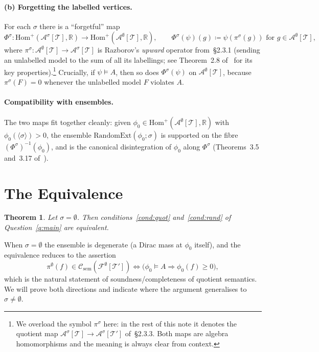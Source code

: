 \documentclass[11pt]{article}
\newtheorem{theorem}{Theorem}
\theoremstyle{definition}
\newcommand{\R}{\mathbb{R}}
\newcommand{\A}{\mathcal{A}}
\newcommand{\F}{\mathcal{F}}
\newcommand{\T}{\mathcal{T}}
\newcommand{\Csem}{\mathcal{C}_{\mathrm{sem}}}
\newcommand{\Homp}{\mathrm{Hom}^{+}}
\newcommand{\RandomExt}{\mathrm{RandomExt}}
\begin{document}
\paragraph{(b) Forgetting the labelled vertices.}
For each $\sigma$ there is a ``forgetful'' map
\[
  \Phi^{\sigma} \colon
  \Homp(\A^{\sigma}[\T], \R) \to \Homp(\A^{\emptyset}[\T], \R),
  \qquad
  \Phi^{\sigma}(\psi)(g) \coloneqq \psi(\pi^{\sigma}(g))
  \text{ for } g \in \A^{\emptyset}[\T],
\]
where $\pi^{\sigma} \colon \A^{\emptyset}[\T] \to \A^{\sigma}[\T]$ is
Razborov's \emph{upward} operator from~\S2.3.1 (sending an unlabelled model
to the sum of all its labellings; see Theorem~2.8 of~\cite{Razborov2007} for
its key properties).\footnote{We overload the symbol $\pi^{\sigma}$ here: in
the rest of this note it denotes the quotient map
$\A^{\sigma}[\T] \to \A^{\sigma}[\T']$ of~\S2.3.3. Both maps are
algebra homomorphisms and the meaning is always clear from context.}
Crucially, if $\psi \models A$, then so does $\Phi^{\sigma}(\psi)$ on
$\A^{\emptyset}[\T]$, because $\pi^{\sigma}(F) = 0$ whenever the unlabelled
model $F$ violates $A$.

\paragraph{Compatibility with ensembles.}
The two maps fit together cleanly: given
$\phi_0 \in \Homp(\A^{\emptyset}[\T], \R)$ with $\phi_0(\langle \sigma \rangle)
> 0$, the ensemble $\RandomExt(\phi_0; \sigma)$ is supported on the fibre
$(\Phi^{\sigma})^{-1}(\phi_0)$, and is the canonical disintegration of $\phi_0$
along $\Phi^{\sigma}$ (Theorems~3.5 and~3.17 of~\cite{Razborov2007}).

\section{The Equivalence}

\begin{theorem}\label{thm:main}
Let $\sigma = \emptyset$. Then conditions~\ref{cond:quot}
and~\ref{cond:rand} of Question~\ref{q:main} are equivalent.
\end{theorem}

When $\sigma = \emptyset$ the ensemble is degenerate (a Dirac mass at
$\phi_0$ itself), and the equivalence reduces to the assertion
\[
  \pi^{\emptyset}(f) \in \Csem(\F^{\emptyset}[\T'])
  \iff
  \bigl(\phi_0 \models A \Rightarrow \phi_0(f) \geq 0\bigr),
\]
which is the natural statement of soundness/completeness of quotient
semantics. We will prove both directions and indicate where the argument
generalises to $\sigma \neq \emptyset$.
\end{document}
